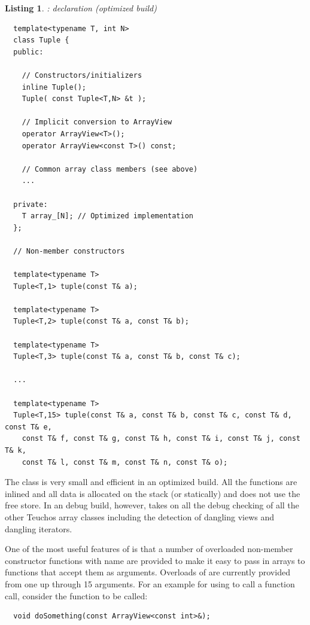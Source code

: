 \documentclass[pdf,ps2pdf,11pt]{SANDreport}
\newtheorem{listing}{Listing}
\begin{document}
\begin{listing}: {} declaration (optimized build) \\
\label{listing:Tuple}
{\small\begin{verbatim}
  template<typename T, int N>
  class Tuple {
  public:
    
    // Constructors/initializers
    inline Tuple();
    Tuple( const Tuple<T,N> &t );
  
    // Implicit conversion to ArrayView
    operator ArrayView<T>();
    operator ArrayView<const T>() const;
    
    // Common array class members (see above)
    ...
  
  private:
    T array_[N]; // Optimized implementation
  };
  
  // Non-member constructors
  
  template<typename T>
  Tuple<T,1> tuple(const T& a);
  
  template<typename T>
  Tuple<T,2> tuple(const T& a, const T& b);
  
  template<typename T>
  Tuple<T,3> tuple(const T& a, const T& b, const T& c);
  
  ...
  
  template<typename T>
  Tuple<T,15> tuple(const T& a, const T& b, const T& c, const T& d, const T& e,
    const T& f, const T& g, const T& h, const T& i, const T& j, const T& k,
    const T& l, const T& m, const T& n, const T& o);
\end{verbatim}}
\end{listing}

The class {} is very small and efficient in an optimized
build.  All the functions are inlined and all data is allocated on the
stack (or statically) and does not use the free store.  In an debug
build, however, {} takes on all the debug checking of all
the other Teuchos array classes including the detection of dangling
{} views and dangling iterators.

One of the most useful features of {} is that a number of
overloaded non-member constructor functions with name
{} are provided to make it easy to pass in arrays to
functions that accept them as {} arguments.  Overloads
of {} are currently provided from one up through 15
arguments.  For an example for using {} to call a
function call, consider the function to be called:

{\small\begin{verbatim}
  void doSomething(const ArrayView<const int>&);
\end{verbatim}}
\end{document}
